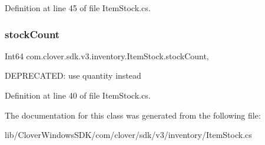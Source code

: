 Definition at line 45 of file Item\+Stock.\+cs.

\mbox{\label{classcom_1_1clover_1_1sdk_1_1v3_1_1inventory_1_1_item_stock_a82cffb225b851027ce3f8177660df6d1}} 
\subsubsection{\texorpdfstring{stock\+Count}{stockCount}}
{\footnotesize\ttfamily Int64 com.\+clover.\+sdk.\+v3.\+inventory.\+Item\+Stock.\+stock\+Count\hspace{0.3cm}{\ttfamily [get]}, {\ttfamily [set]}}



D\+E\+P\+R\+E\+C\+A\+T\+ED\+: use quantity instead 



Definition at line 40 of file Item\+Stock.\+cs.



The documentation for this class was generated from the following file\+:\begin{DoxyCompactItemize}
\item 
lib/\+Clover\+Windows\+S\+D\+K/com/clover/sdk/v3/inventory/Item\+Stock.\+cs\end{DoxyCompactItemize}
